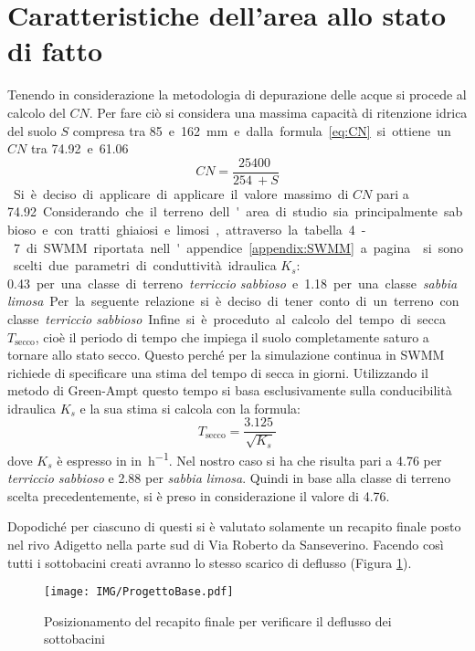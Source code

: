 \section{Caratteristiche dell’area allo stato di fatto}
Tenendo in considerazione la metodologia di depurazione delle acque si procede al calcolo del $CN$. 
Per fare ciò si considera una massima capacità di ritenzione idrica del suolo $S$ compresa tra \SI{85} e \SI{162}{\milli\metre} e dalla formula \ref{eq:CN} si ottiene un $CN$ tra \SI{74.92} e \SI{61.06}.
\begin{equation}
\label{eq:CN}
    CN = \frac{\SI{25400}{}}{\SI{254}{} + S}
\end{equation}
Si è deciso di applicare di applicare il valore massimo di $CN$ pari a \SI{74.92}.

Considerando che il terreno dell'area di studio sia principalmente sabbioso e con tratti ghiaiosi e limosi, attraverso la tabella 4-7 di SWMM riportata nell'appendice \ref{appendix:SWMM} a pagina \pageref{SWMM:tabella4-7} si sono scelti due parametri di conduttività idraulica $K_s$: \SI{0.43} per una classe di terreno \emph{terriccio sabbioso} e \SI{1.18} per una classe \emph{sabbia limosa}. 
Per la seguente relazione si è deciso di tener conto di un terreno con classe \emph{terriccio sabbioso}.

Infine si è proceduto al calcolo del tempo di secca $T_{\text{secco}}$, cioè il periodo di tempo che impiega il suolo completamente saturo a tornare allo stato secco.
Questo perché per la simulazione continua in SWMM richiede di specificare una stima del tempo di secca in giorni.
Utilizzando il metodo di Green-Ampt questo tempo si basa esclusivamente sulla conducibilità idraulica $K_s$ e la sua stima si calcola con la formula: 
\begin{equation}
    T_{\text{secco}} = \frac{\SI{3.125}{}}{\sqrt{K_s}}
\end{equation}
dove $K_s$ è espresso in \si{in\per\hour}.
Nel nostro caso si ha che risulta pari a \SI{4.76}{\days} per \emph{terriccio sabbioso} e \SI{2.88}{\days} per \emph{sabbia limosa}. 
Quindi in base alla classe di terreno scelta precedentemente, si è preso in considerazione il valore di \SI{4.76}{\days}.

Dopodiché per ciascuno di questi si è valutato solamente un recapito finale posto nel rivo Adigetto nella parte sud di Via Roberto da Sanseverino. 
Facendo così tutti i sottobacini creati avranno lo stesso scarico di deflusso (Figura \ref{fig:ProgettoBase}).
\begin{figure}[p]
    \centering
    \texttt{[image: IMG/ProgettoBase.pdf]} 
    \caption{Posizionamento del recapito finale per verificare il deflusso dei sottobacini}
    \label{fig:ProgettoBase}
\end{figure}

